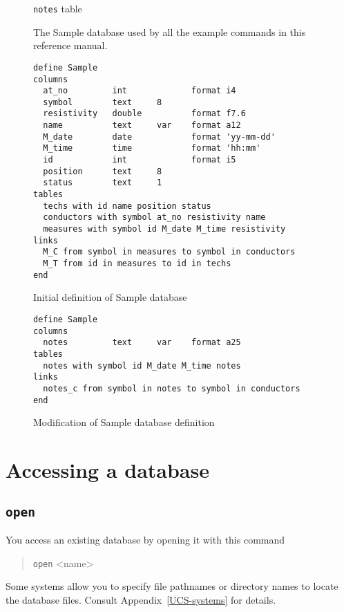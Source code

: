 \documentclass[11pt,a4paper]{report}
\begin{document}
\begin{figure}[htp]
\begin{center}
  \smallskip
          {\verb!notes! table }
\end{center}
\caption[The Sample database]
  {The Sample database used by all the example commands
   in this reference manual.}
\label{Sample}
\end{figure}
 
 
 
\begin{figure}[htp]
\begin{verbatim}
define Sample
columns
  at_no         int             format i4
  symbol        text     8
  resistivity   double          format f7.6
  name          text     var    format a12
  M_date        date            format 'yy-mm-dd'
  M_time        time            format 'hh:mm'
  id            int             format i5
  position      text     8
  status        text     1
tables
  techs with id name position status
  conductors with symbol at_no resistivity name
  measures with symbol id M_date M_time resistivity
links
  M_C from symbol in measures to symbol in conductors
  M_T from id in measures to id in techs
end
\end{verbatim}
\caption{Initial definition of Sample database}
\label{Sample-def1}
\end{figure}
 
 
\begin{figure}[htp]
\begin{verbatim}
define Sample
columns
  notes         text     var    format a25
tables
  notes with symbol id M_date M_time notes
links
  notes_c from symbol in notes to symbol in conductors
end
\end{verbatim}
\caption{Modification of Sample database definition}
\label{Sample-def2}
\end{figure}
 
\section{Accessing a database}
%
\subsection{{\tt open}}
You access an existing database by opening it with this command
\begin{verse}
\verb|open| <name>
\end{verse}
Some systems allow you to specify file pathnames or
directory names to locate the database files.
Consult Appendix~\ref{UCS-systems} for details.
 
\end{document}
